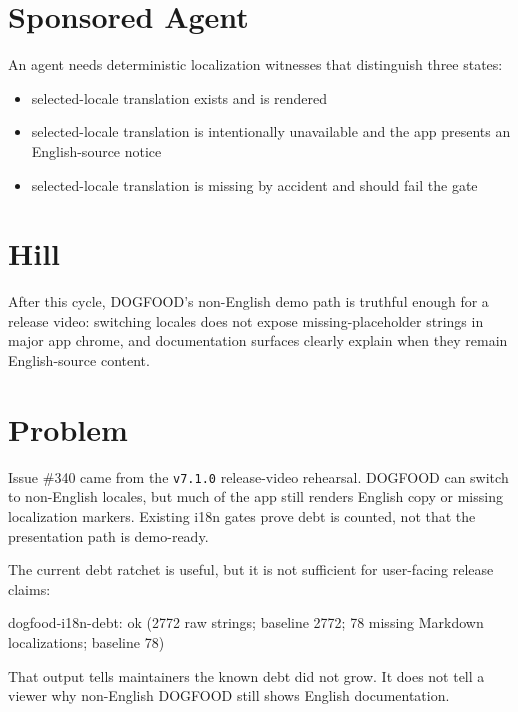 \section{Sponsored Agent}\label{record-196-sponsored-agent}

An agent needs deterministic localization witnesses that distinguish three states:

\begin{itemize}
\tightlist
\item
  selected-locale translation exists and is rendered
\item
  selected-locale translation is intentionally unavailable and the app presents an English-source notice
\item
  selected-locale translation is missing by accident and should fail the gate
\end{itemize}

\section{Hill}\label{record-196-hill}

After this cycle, DOGFOOD's non-English demo path is truthful enough for a release video: switching locales does not expose missing-placeholder strings in major app chrome, and documentation surfaces clearly explain when they remain English-source content.

\section{Problem}\label{record-196-problem}

Issue \#340 came from the \texttt{v\allowbreak{}7\allowbreak{}.\allowbreak{}1\allowbreak{}.\allowbreak{}0} release-video rehearsal. DOGFOOD can switch to non-English locales, but much of the app still renders English copy or missing localization markers. Existing i18n gates prove debt is counted, not that the presentation path is demo-ready.

The current debt ratchet is useful, but it is not sufficient for user-facing release claims:

\begin{CodeBlock}
dogfood-i18n-debt: ok (2772 raw strings; baseline 2772; 78 missing Markdown localizations; baseline 78)
\end{CodeBlock}

That output tells maintainers the known debt did not grow. It does not tell a viewer why non-English DOGFOOD still shows English documentation.

